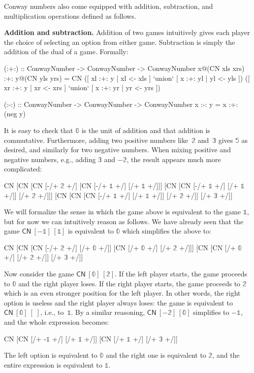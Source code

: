 \documentclass[authoryear,preprint]{sigplanconf}
\newcommand{\zerog}{\mathbb{0}}
\newcommand{\oneg}{\mathbb{1}}
\newcommand{\twog}{\mathbb{2}}
\newcommand{\threeg}{\mathbb{3}}
\newcommand{\fiveg}{\mathbb{5}}
\begin{document}
Conway numbers also come equipped with addition, subtraction, and
multiplication operations defined as follows.

\noindent\textbf{Addition and subtraction.} Addition of two games intuitively
gives each player the choice of selecting an option from either
game. Subtraction is simply the addition of the dual of a game. Formally:
\begin{code}
(:+:) :: ConwayNumber -> ConwayNumber -> ConwayNumber
x@(CN xls xrs) :+: y@(CN yls yrs) = 
  CN 
    ([ xl :+: y | xl <- xls ] `union`
     [ x :+: yl | yl <- yls ])
    ([ xr :+: y | xr <- xrs ] `union`
     [ x :+: yr | yr <- yrs ])

(:-:) :: ConwayNumber -> ConwayNumber -> ConwayNumber
x :-: y = x :+: (neg y) 
\end{code}
It is easy to check that $\zerog$ is the unit of addition and that addition
is commutative. Furthermore, adding two positive numbers like~$\twog$
and~$\threeg$ gives $\fiveg$ as desired, and similarly for two negative
numbers. When mixing positive and negative numbers, e.g., adding $\threeg$
and $-\twog$, the result appears much more complicated:
\begin{code}
CN [CN  [CN  [-/+ $\twog$ +/] 
             [CN [-/+ $\oneg$ +/] [/+ $\oneg$ +/]]]
        [CN  [CN [-/+ $\oneg$ +/] [/+ $\oneg$ +/]] 
             [/+ $\twog$ +/]]] 
   [CN  [CN  [CN [-/+ $\oneg$ +/] [/+ $\oneg$ +/]] 
             [/+ $\twog$ +/]] 
        [/+ $\threeg$ +/]]
\end{code}
We will formalize the sense in which the game above is equivalent to the game
$\oneg$, but for now we can intuitively reason as follows. We have already
seen that the game $\textsf{CN}~[-\oneg]~[\oneg]$ is equivalent to $\zerog$
which simplifies the above to:
\begin{code}
CN [CN  [CN  [-/+ $\twog$ +/] [/+ $\zerog$ +/]]
        [CN  [/+ $\zerog$ +/] [/+ $\twog$ +/]]]
   [CN  [CN  [/+ $\zerog$ +/] [/+ $\twog$ +/]]
        [/+ $\threeg$ +/]]
\end{code}
Now consider the game $\textsf{CN}~[\zerog]~[\twog]$. If the left player
starts, the game proceeds to $\zerog$ and the right player loses. If the
right player starts, the game proceeds to $\twog$ which is an even stronger
position for the left player. In other words, the right option is useless and
the right player always loses: the game is equivalent to
$\textsf{CN}~[\zerog]~[\;]$, i.e., to~$\oneg$. By a similar reasoning,
$\textsf{CN}~[-\twog]~[\zerog]$ simplifies to $-\oneg$, and the whole
expression becomes:
\begin{code}
CN [CN  [/+ -$\oneg$ +/] [/+ $\oneg$ +/]]
   [CN  [/+ $\oneg$ +/] [/+ $\threeg$ +/]]
\end{code}
The left option is equivalent to $\zerog$ and the right one is equivalent to
$\twog$, and the entire expression is equivalent to $\oneg$.
\end{document}
